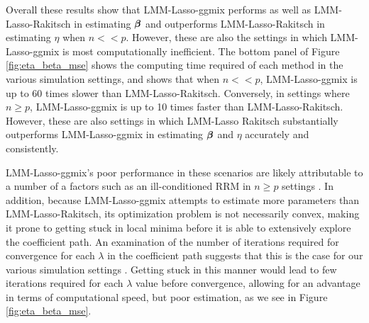 Overall these results show that LMM-Lasso-ggmix performs as well as LMM-Lasso-Rakitsch in estimating $\boldsymbol{\beta}{}$ and outperforms LMM-Lasso-Rakitsch in estimating $\eta$ when $n << p$. However, these are also the settings in which LMM-Lasso-ggmix is most computationally inefficient. The bottom panel of Figure \ref{fig:eta_beta_mse} shows the computing time required of each method in the various simulation settings, and shows that when $n << p$, LMM-Lasso-ggmix is up to 60 times slower than LMM-Lasso-Rakitsch. Conversely, in settings where $n \ge p$, LMM-Lasso-ggmix is up to 10 times faster than LMM-Lasso-Rakitsch. However, these are also settings in which LMM-Lasso Rakitsch substantially outperforms LMM-Lasso-ggmix in estimating $\boldsymbol{\beta}{}$ and $\eta$ accurately and consistently. 

LMM-Lasso-ggmix's poor performance in these scenarios are likely attributable to a number of a factors such as an ill-conditioned RRM  in $n \ge p$ settings \citep{ledoit2004well}. In addition, because LMM-Lasso-ggmix attempts to estimate more parameters than LMM-Lasso-Rakitsch, its optimization problem is not necessarily convex, making it prone to getting stuck in local minima before it is able to extensively explore the coefficient path. An examination of the number of iterations required for convergence for each $\lambda$ in the coefficient path suggests that this is the case for our various simulation settings . Getting stuck in this manner would lead to few iterations required for each $\lambda$ value before convergence, allowing for an advantage in terms of computational speed, but poor estimation, as we see in Figure \ref{fig:eta_beta_mse}.


